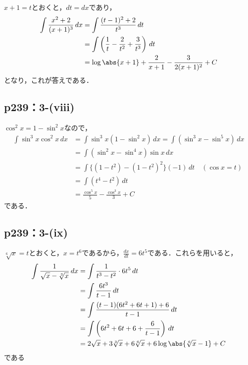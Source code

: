 \documentclass[a4paper,10pt,fleqn]{ltjsarticle}
\begin{document}
\begin{tleftbar}
    $x+1 =t$とおくと，$dt=dx$であり，
    \begin{align*}
        \int \frac{x^2+2}{(x+1)^3} \, dx & = \int \frac{(t-1)^2+2}{t^3} \, dt \\
        & = \int \left (\frac{1}{t}-\frac{2}{t^2}+\frac{3}{t^3}\right) \, dt \\
        & = \log \abs{x+1}+\frac{2}{x+1}-\frac{3}{2(x+1)^2}+C
    \end{align*}
    となり，これが答えである．
\end{tleftbar}

\subsection*{p239：3-(viii)}

\begin{tleftbar}
    $\cos ^2 x = 1- \sin ^2 x$なので，
    \begin{align*}
        \int \sin ^3 x \cos ^2 x \, dx & = \int \sin ^3 x (1-\sin ^2 x) \, dx = \int (\sin ^3 x - \sin ^5 x ) \, dx \\
        & = \int (\sin ^2 x - \sin ^4 x) \sin x \, dx \\
        & = \int \{ (1-t^2)- (1-t^2)^2 \} (-1) \, dt \quad (\cos x =t) \\
        & = \int (t^4 -t^2) \, dt \\
        & = \frac{\cos ^5 x}{5}-\frac{\cos ^3 x}{3}+C
    \end{align*}
    である．
\end{tleftbar}

\subsection*{p239：3-(ix)}

\begin{tleftbar}
    $\sqrt[6]{x}=t$とおくと，$x=t^6$であるから，$\frac{dx}{dt}=6t^5$である．これらを用いると，
    \begin{align*}
        \int \frac{1}{\sqrt{x}-\sqrt[3]{x}} \, dx & = \int \frac{1}{t^3-t^2} \cdot 6t^5 \, dt \\
        & = \int \frac{6t^3}{t-1} \, dt \\
        & = \int \frac{(t-1)(6t^2+6t+1)+6}{t-1} \, dt \\
        & = \int \left (6t^2+6t+6 + \frac{6}{t-1}\right) \, dt \\
        & = 2\sqrt{x}+3 \sqrt[3]{x} + 6 \sqrt[6]{x} + 6 \log \abs{\sqrt[6]{x}-1}+ C
    \end{align*}
    である
\end{tleftbar}
\end{document}
